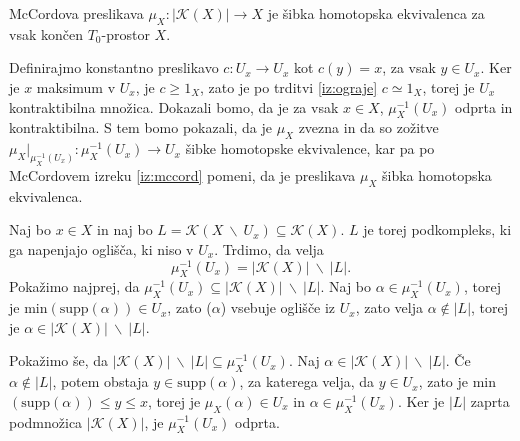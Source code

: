 \documentclass[mat1]{fmfdelo}
\begin{document}
\begin{izrek}
    McCordova preslikava $\mu_X\colon |\mathcal{K}(X)|\rightarrow X$ je šibka homotopska 
    ekvivalenca za vsak končen $T_0$-prostor $X$.
    \label{iz:ksibka}
\end{izrek}

\begin{dokaz}
    Definirajmo konstantno preslikavo $c\colon U_x\rightarrow U_x$ kot 
    $c(y)=x$, za vsak $y\in U_x$. Ker je $x$ maksimum v 
    $U_x$, je $c\geq 1_X$, zato je po trditvi 
    \ref{iz:ograje} $c\simeq 1_X$, torej je $U_x$ 
    kontraktibilna množica. Dokazali bomo, da je za vsak 
    $x\in X$, $\mu_X^{-1}(U_x)$ odprta in kontraktibilna. S 
    tem bomo pokazali, da je $\mu_X$ zvezna in da so 
    zožitve $\mu_X|_{\mu_X^{-1}(U_x)}\colon \mu_X^{-1}(U_x)\rightarrow 
    U_x$ šibke homotopske ekvivalence, kar pa po McCordovem izreku \ref{iz:mccord}
    pomeni, da je preslikava $\mu_X$ šibka homotopska ekvivalenca.

    Naj bo $x\in X$ in naj bo $L=\mathcal{K}(X\ \backslash \
    U_x)\subseteq \mathcal{K}(X)$. $L$ je torej 
    podkompleks, ki ga napenjajo oglišča, ki niso v $U_x$. 
    Trdimo, da velja
    $$
    \mu_X^{-1}(U_x)=|\mathcal{K}(X)|\ \backslash \ |L|.
    $$
    Pokažimo najprej, da $\mu_X^{-1}(U_x)\subseteq 
    |\mathcal{K}(X)|\ \backslash \ |L|$. Naj bo $\alpha \in 
    \mu_X^{-1}(U_x)$, torej je min$(
    (\alpha))\in U_x$, zato \text{supp}($\alpha$) vsebuje 
    oglišče iz $U_x$, zato velja $\alpha \notin |L|$, torej je $\alpha 
    \in |\mathcal{K}(X)|\ \backslash \ |L|$.

    Pokažimo še, da $|\mathcal{K}(X)|\ \backslash \
    |L|\subseteq \mu_X^{-1}(U_x)$. Naj $\alpha \in |\mathcal{K}(X)|\ \backslash \ |L|.$
    Če  $\alpha \notin |L|$, potem obstaja $y\in 
    \text{supp}(\alpha)$, za katerega velja, da $y \in U_x$, zato je 
    min$(\text{supp}(\alpha))\leq y \leq x$, torej je 
    $\mu_X(\alpha) \in U_x$ in $\alpha \in \mu_X^{-1}
    (U_x)$.
    Ker je $|L|$ zaprta podmnožica $|\mathcal{K}(X)|$, je 
    $\mu_X^{-1}(U_x)$ odprta.


\end{dokaz}
\end{document}

